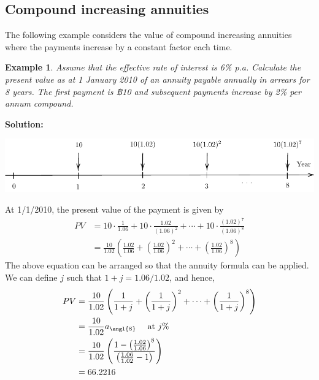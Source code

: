 \documentclass[
]{book}
\theoremstyle{definition}
\theoremstyle{definition}
\newtheorem{example}{Example}[chapter]
\theoremstyle{definition}
\theoremstyle{definition}
\theoremstyle{remark}
\begin{document}
\subsection{Compound increasing annuities}\label{compound-increasing-annuities}

The following example considers the value of compound increasing
annuities where the payments increase by a constant factor each time.

\begin{example}
\emph{Assume that the effective rate of interest is 6\% p.a. Calculate the
present value as at 1 January 2010 of an annuity payable annually in
arrears for 8 years. The first payment is ฿10 and subsequent payments
increase by 2\% per annum compound.}
\end{example}

\textbf{Solution:}

\begin{center}\includegraphics{SCMA266Bookdownproj_files/figure-latex/tikz-ex20-1} \end{center}

At 1/1/2010, the present value of the payment is given by
\[\begin{aligned}
    PV &= 10 \cdot \frac{1}{1.06} + 10 \cdot \frac{1.02}{(1.06)^2} + \cdots +  10 \cdot \frac{(1.02)^7}{(1.06)^8} \\
        &= \frac{10}{1.02} \left(  \frac{1.02}{1.06} +  \left(  \frac{1.02}{1.06}  \right)^2 + \cdots +
    \left(  \frac{1.02}{1.06}  \right)^8  \right)\end{aligned}\] The
above equation can be arranged so that the annuity formula can be
applied. We can define \(j\) such that \(1 + j = 1.06/1.02\), and hence,
\[\begin{aligned}
    PV &= \frac{10}{1.02} \left(  \frac{1}{1 + j} +  \left(  \frac{1}{1+j}  \right)^2 + \cdots +
    \left(  \frac{1}{1+j}  \right)^8  \right)  \\
    &=   \frac{10}{1.02}  a_\angl{8} \quad  \text{ at } j\% \\
    &=  \frac{10}{1.02} \left(   \frac{1 - \left(\frac{1.02}{1.06}\right)^8   }{\left(   \frac{1.06}{1.02}   - 1 \right)}  \right) \\
    &= 66.2216\end{aligned}\]
\end{document}
